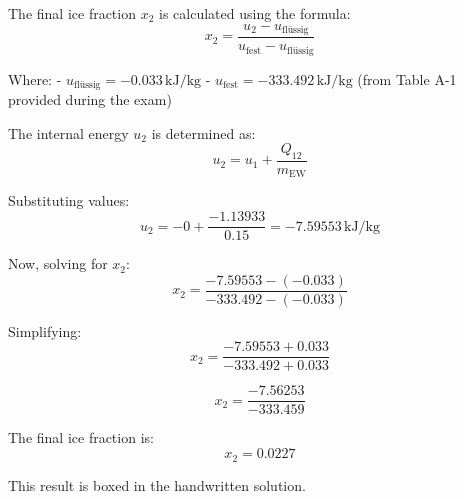 The final ice fraction \( x_2 \) is calculated using the formula:  
\[
x_2 = \frac{u_2 - u_{\text{flüssig}}}{u_{\text{fest}} - u_{\text{flüssig}}}
\]  

Where:  
- \( u_{\text{flüssig}} = -0.033 \, \text{kJ/kg} \)  
- \( u_{\text{fest}} = -333.492 \, \text{kJ/kg} \) (from Table A-1 provided during the exam)  

The internal energy \( u_2 \) is determined as:  
\[
u_2 = u_1 + \frac{Q_{12}}{m_{\text{EW}}}
\]  

Substituting values:  
\[
u_2 = -0 + \frac{-1.13933}{0.15} = -7.59553 \, \text{kJ/kg}
\]  

Now, solving for \( x_2 \):  
\[
x_2 = \frac{-7.59553 - (-0.033)}{-333.492 - (-0.033)}
\]  

Simplifying:  
\[
x_2 = \frac{-7.59553 + 0.033}{-333.492 + 0.033}
\]  

\[
x_2 = \frac{-7.56253}{-333.459}
\]  

The final ice fraction is:  
\[
x_2 = 0.0227
\]  

This result is boxed in the handwritten solution.